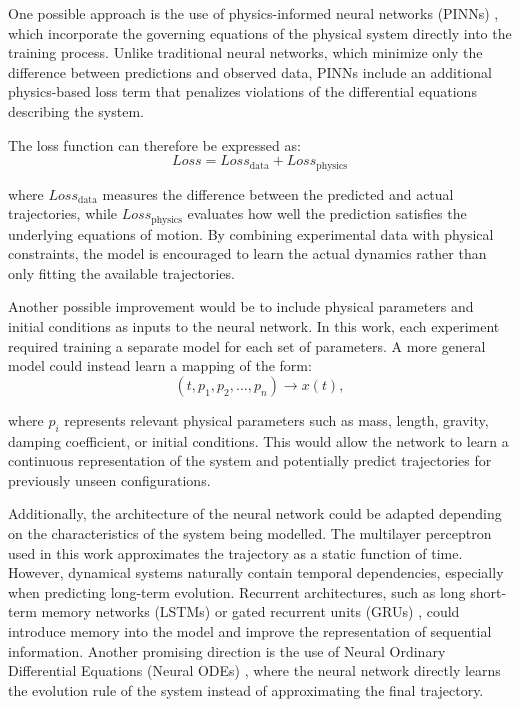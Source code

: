 One possible approach is the use of physics-informed neural networks (PINNs) \cite{raissi2019physics}, which incorporate the governing equations of the physical system directly into the training process. Unlike traditional neural networks, which minimize only the difference between predictions and observed data, PINNs include an additional physics-based loss term that penalizes violations of the differential equations describing the system.

The loss function can therefore be expressed as:
\begin{equation}
{Loss} = {Loss}_{\text{data}} + {Loss}_{\text{physics}}
\end{equation}

where ${Loss}_{\text{data}}$ measures the difference between the predicted and actual trajectories, while ${Loss}_{\text{physics}}$ evaluates how well the prediction satisfies the underlying equations of motion. By combining experimental data with physical constraints, the model is encouraged to learn the actual dynamics rather than only fitting the available trajectories.

Another possible improvement would be to include physical parameters and initial conditions as inputs to the neural network. In this work, each experiment required training a separate model for each set of parameters. A more general model could instead learn a mapping of the form:
\begin{equation}
    (t, p_1, p_2, ...,p_n) \rightarrow x(t),
\end{equation}

where $p_i$ represents relevant physical parameters such as mass, length, gravity, damping coefficient, or initial conditions. This would allow the network to learn a continuous representation of the system and potentially predict trajectories for previously unseen configurations.

Additionally, the architecture of the neural network could be adapted depending on the characteristics of the system being modelled. The multilayer perceptron used in this work approximates the trajectory as a static function of time. However, dynamical systems naturally contain temporal dependencies, especially when predicting long-term evolution. Recurrent architectures, such as long short-term memory networks (LSTMs) or gated recurrent units (GRUs) \cite{hochreiter1997long, cho2014learning}, could introduce memory into the model and improve the representation of sequential information. Another promising direction is the use of Neural Ordinary Differential Equations (Neural ODEs) \cite{chen2018neural}, where the neural network directly learns the evolution rule of the system instead of approximating the final trajectory.

